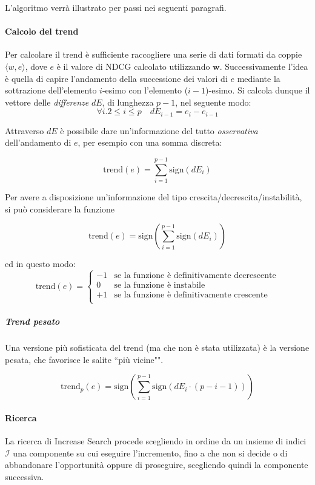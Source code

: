 L'algoritmo verrà illustrato per passi nei seguenti paragrafi.

\paragraph{Calcolo del trend}
Per calcolare il trend è sufficiente raccogliere una serie di dati formati
da coppie $\langle w, e\rangle$, dove $e$ è il valore di NDCG calcolato
utilizzando $\boldsymbol{w}$. Successivamente l'idea è quella di capire
l'andamento della successione dei valori di $e$ mediante
la sottrazione dell'elemento $i$-esimo con l'elemento ($i-1$)-esimo.
Si calcola dunque il vettore delle \textit{differenze} $dE$, di lunghezza $p-1$, nel seguente modo:
$$
\forall{i.2 \leq i \leq p} \quad dE_{i-1} = e_{i} - e_{i-1}
$$

Attraverso $dE$ è possibile dare un'informazione del tutto
\textit{osservativa} dell'andamento di $e$, per esempio
con una somma discreta:

$$
\text{trend}(e) = \sum_{i=1}^{p-1} \text{sign}(dE_i)
$$

Per avere a disposizione un'informazione del tipo crescita/decrescita/instabilità,
si può considerare la funzione

$$
\text{trend}(e) = \text{sign}\left(\sum_{i=1}^{p-1} \text{sign}(dE_i)\right)
$$

ed in questo modo:
$$
\text{trend}(e) =
\begin{cases}
-1 & \text{se la funzione è definitivamente decrescente} \\
0 & \text{se la funzione è instabile} \\
+1 & \text{se la funzione è definitivamente crescente} \\
\end{cases}
$$

\subparagraph{Trend pesato}
Una versione più sofisticata del trend (ma che non è stata utilizzata)
è la versione pesata, che favorisce le salite ``più vicine"".

$$
\text{trend}_p(e) = \text{sign}\left(\sum_{i=1}^{p-1} \text{sign}\left(dE_i \cdot (p-i-1)\right)\right)
$$


\paragraph{Ricerca}
La ricerca di Increase Search procede scegliendo in ordine da
un insieme di indici $\mathcal{I}$ una componente su cui eseguire
l'incremento, fino a che non si decide o di abbandonare
l'opportunità oppure di proseguire, scegliendo quindi la componente successiva.

